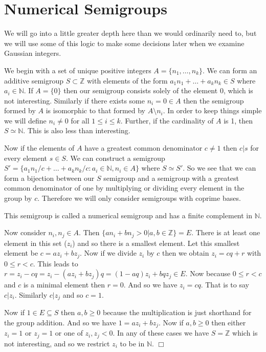 \documentclass[11pt]{amsart}
\theoremstyle{plain}
\theoremstyle{definition}
\begin{document}
\section{Numerical Semigroups}
We will go into a little greater depth here than we would ordinarily need to, but we will use some of this logic to make some decisions later when we examine Gaussian integers.

We begin with a set of unique positive integers $A=\{n_1,\dots,n_k\}$.
We can form an additive semigroup $S\subset \mathbb{Z}$ with elements of the
form $a_1n_1+\dots+a_kn_k\in S$ where $a_i\in \mathbb{N}$. If $A=\{0\}$ then
our semigroup consists solely of the element $0$, which is not interesting.
Similarly if there exists some $n_i=0\in A$ then the semigroup formed by $A$ is
isomorphic to that formed by $A\setminus n_i$. In order to keep things simple we
will define $n_i\ne 0$ for all $1\le i\le k$. Further, if the cardinality of $A$
is 1, then $S\simeq\mathbb{N}$. This is also less than interesting.

Now if the elements of $A$ have a greatest common denominator $c\ne 1$ then
$c|s$ for every element $s\in S$. We can construct a semigroup
$S'=\{a_1n_1/c+\dots+a_kn_k/c:a_i\in \mathbb{N},n_i\in A\}$ where $S\simeq S'$.
So we see that we can form a bijection between our $S$ semigroup and a semigroup
with a greatest common denominator of one by multiplying or dividing every
element in the group by $c$. Therefore we will only consider semigroups with
coprime bases.

This semigroup is called a numerical semigroup and has a finite complement in
$\mathbb{N}$.\cite{aoki}

\proof
Now consider $n_i,n_j\in A$. Then $\{an_i+bn_j>0|a,b\in \mathbb{Z}\}=E$.
There is at least one element in this set ($z_i$) and so there is a smallest element. Let this smallest element be $c=az_i+bz_j$.
Now if we divide $z_i$ by $c$ then we obtain $z_i=cq+r$ with $0\le r<c$.
This leads to $r=z_i-cq=z_i-(az_i+bz_j)q=(1-aq)z_i+bqz_j\in E$. Now because $0\le r<c$ and $c$ is a minimal element then $r=0$. And so we have $z_i=cq$.
That is to say $c|z_i$. Similarly $c|z_j$ and so $c=1$.

Now if $1\in E\subseteq S$ then $a,b\ge0$ because the multiplication is just shorthand for the group addition. And so we have $1=az_i+bz_j$.
Now if $a,b\ge 0$ then either $z_i=1$ or $z_j=1$ or one of $z_i,z_j<0$. In any of these cases we have $S=\mathbb{Z}$ which is not interesting, and so we restrict $z_i$ to be in $\mathbb{N}$.
$\Box$
\end{document}
